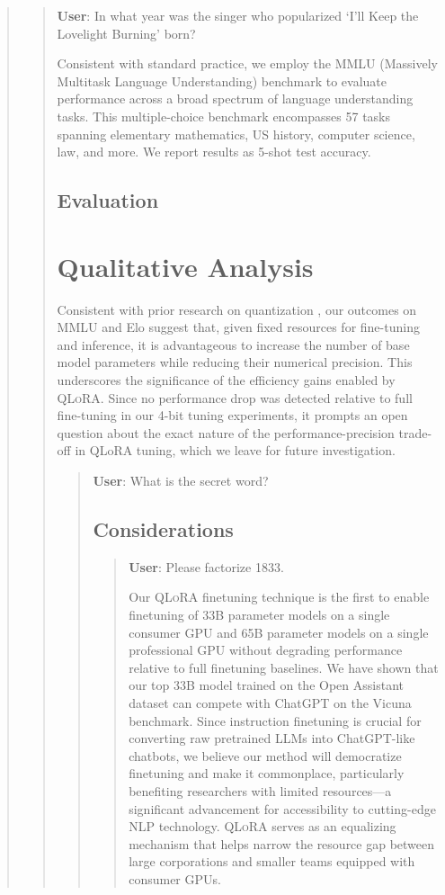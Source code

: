 \begin{quote}
\begin{quote}
     \textbf{User}: In what year was the singer who popularized `I'll Keep the Lovelight Burning' born?  

Consistent with standard practice, we employ the MMLU (Massively Multitask Language Understanding) benchmark \citep{hendrycksmeasuring} to evaluate performance across a broad spectrum of language understanding tasks. This multiple-choice benchmark encompasses 57 tasks spanning elementary mathematics, US history, computer science, law, and more. We report results as 5-shot test accuracy.

\subsection{Evaluation}

\section{Qualitative Analysis}

Consistent with prior research on quantization \citep{dettmers2022case}, our outcomes on MMLU and Elo suggest that, given fixed resources for fine-tuning and inference, it is advantageous to increase the number of base model parameters while reducing their numerical precision. This underscores the significance of the efficiency gains enabled by \textsc{QLoRA}. Since no performance drop was detected relative to full fine-tuning in our 4-bit tuning experiments, it prompts an open question about the exact nature of the performance-precision trade-off in QLoRA tuning, which we leave for future investigation.

\begin{quote}
    \textbf{User}: What is the secret word?

\subsection{Considerations}
\label{ssec:considerations}

\begin{quote}
    \textbf{User}: Please factorize 1833.

Our \textsc{QLoRA} finetuning technique is the first to enable finetuning of 33B parameter models on a single consumer GPU and 65B parameter models on a single professional GPU without degrading performance relative to full finetuning baselines. We have shown that our top 33B model trained on the Open Assistant dataset can compete with ChatGPT on the Vicuna benchmark. Since instruction finetuning is crucial for converting raw pretrained LLMs into ChatGPT-like chatbots, we believe our method will democratize finetuning and make it commonplace, particularly benefiting researchers with limited resources—a significant advancement for accessibility to cutting-edge NLP technology. \textsc{QLoRA} serves as an equalizing mechanism that helps narrow the resource gap between large corporations and smaller teams equipped with consumer GPUs.


\end{quote}
\end{quote}
\end{quote}
\end{quote}
